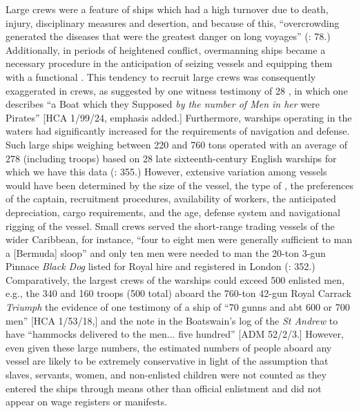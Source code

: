 Large crews were a feature of ships which had a high  turnover due to death, injury, disciplinary measures and desertion, and because of this, “overcrowding generated the diseases that were the greatest danger on long voyages” (\citealt{Bicheno2012}: 78.) Additionally, in periods of heightened conflict, overmanning ships became a necessary procedure in the anticipation of seizing vessels and equipping them with a functional . This tendency to recruit large crews was consequently exaggerated in  crews, as suggested by one witness testimony of 28 \citealt{March1722}, in which one  describes “a Boat which they Supposed \textit{by the number of Men in her} were Pirates” [HCA 1/99/24, emphasis added.] Furthermore, warships operating in the  waters had significantly increased  for the requirements of navigation and defense. Such large ships weighing between 220 and 760 tons operated with an average  of 278 (including troops) based on 28 late sixteenth-century English warships for which we have this data (\citealt{Bicheno2012}: 355.) However, extensive variation among vessels would have been determined by the size of the vessel, the type of , the preferences of the captain, recruitment procedures, availability of workers, the anticipated  depreciation, cargo requirements, and the age, defense system and navigational rigging of the vessel. Small crews served the short-range trading vessels of the wider Caribbean, for instance, “four to eight men were generally sufficient to man a [Bermuda] sloop” \citep[123]{Jarvis2010} and only ten men were needed to man the 20-ton 3-gun Pinnace \textit{Black Dog} listed for Royal hire and registered in London (\citealt{Bicheno2012}: 352.) Comparatively, the largest crews of the warships could exceed 500 enlisted men, e.g., the 340  and 160 troops (500 total) aboard the 760-ton 42-gun Royal Carrack \textit{Triumph} \citep[355,]{Bicheno2012} the evidence of one testimony of a ship of “70 gunns and abt 600 or 700 men” [HCA 1/53/18,] and the note in the Boatswain’s log of the \textit{St Andrew} to have “hammocks delivered to the men... five hundred” [ADM 52/2/3.] However, even given these large  numbers, the estimated numbers of people aboard any vessel are likely to be extremely conservative in light of the assumption that slaves, servants, women, and non-enlisted children were not counted as they entered the ships through means other than official enlistment and did not appear on wage registers or  manifests. 

